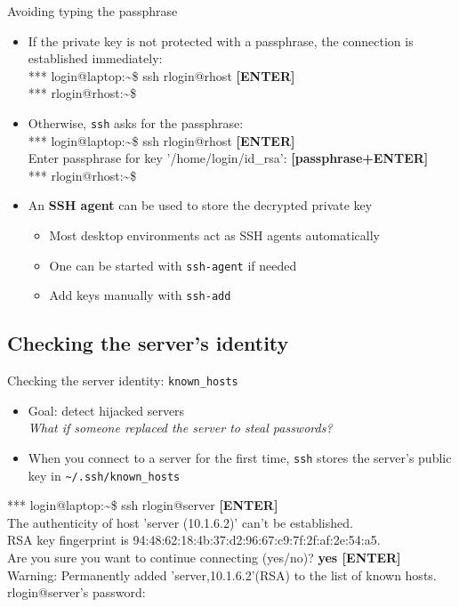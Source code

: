 \documentclass[11pt,final,usepdftitle=false]{beamer}
\newcommand{\tilda}{\textasciitilde{}}
\begin{document}
\begin{frame}{Avoiding typing the passphrase}
\begin{itemize}
\item If the private key is not protected with a passphrase, the connection is established immediately:\\ \hbr
{\ttfamily\footnotesize 
*** login@laptop:\tilda\$  ssh rlogin@rhost \textbf{ [ENTER]}\\
*** rlogin@rhost:\tilda\$\\ }
\hbr
\item Otherwise, \texttt{ssh} asks for the passphrase:\\ \hbr
{\ttfamily\footnotesize 
*** login@laptop:\tilda\$ ssh rlogin@rhost \textbf{ [ENTER]}\\
Enter passphrase for key '/home/login/id\_rsa':  \textbf{[passphrase+ENTER]}\\ 
*** rlogin@rhost:\tilda\$\\ }
\hbr
\item An \textbf{SSH agent} can be used to store the decrypted private key
\begin{itemize}
	\item Most desktop environments act as SSH agents automatically
	\item One can be started with \texttt{ssh-agent} if needed
	\item Add keys manually with \texttt{ssh-add}
\end{itemize}
\end{itemize}
\end{frame}

\subsection{Checking the server's identity}

\begin{frame}{Checking the server identity: \texttt{known\_hosts}}
\begin{itemize}
\item Goal: detect hijacked servers\\
\textsl{What if someone replaced the server to steal passwords?}
\hbr
\item When you connect to a server for the first time, \texttt{ssh} stores the server's public key in
	\texttt{\tilda/.ssh/known\_hosts}
\end{itemize}
{\ttfamily\small
*** login@laptop:\tilda\$ ssh rlogin@server\textbf{ [ENTER]}\\ 
The authenticity of host 'server (10.1.6.2)' can't be established.\\
RSA key fingerprint is 94:48:62:18:4b:37:d2:96:67:c9:7f:2f:af:2e:54:a5.\\
Are you sure you want to continue connecting (yes/no)? \textbf{yes [ENTER]}\\ 
Warning: Permanently added 'server,10.1.6.2'(RSA) to the list of known hosts.\\
rlogin@server's password:\\ }
\end{frame}
\end{document}
